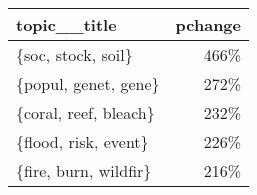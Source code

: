 \begin{tabular}{p{1.2cm}r}
\toprule
          topic\_\_title &  pchange \\
\midrule
    \{soc, stock, soil\} &     466\% \\
  \{popul, genet, gene\} &     272\% \\
 \{coral, reef, bleach\} &     232\% \\
  \{flood, risk, event\} &     226\% \\
 \{fire, burn, wildfir\} &     216\% \\
\bottomrule
\end{tabular}

